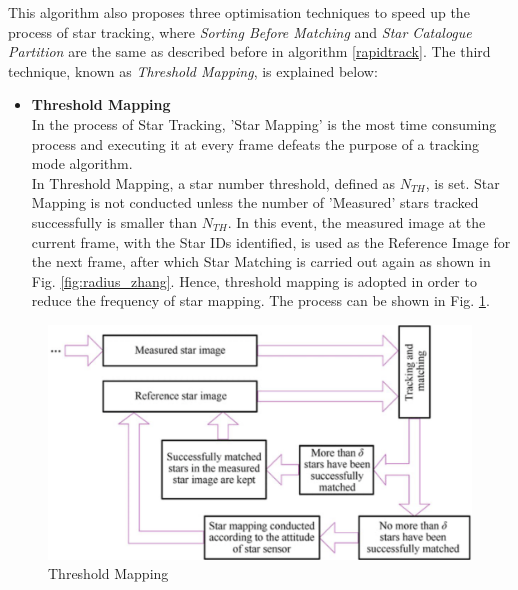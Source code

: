 \documentclass[../../main.tex]{subfiles}
\begin{document}
This algorithm also proposes three optimisation techniques to speed up the process of star tracking, where \textit{Sorting Before Matching} and \textit{Star Catalogue Partition} are the same as described before in algorithm \ref{rapidtrack}. The third technique, known as \textit{Threshold Mapping}, is explained below: 
\begin{itemize}
    \item \textbf{Threshold Mapping}\\ \label{threshold_mapping}
    In the process of Star Tracking, 'Star Mapping' is the most time consuming process and executing it at every frame defeats the purpose of a tracking mode algorithm. \\
    In Threshold Mapping, a star number threshold, defined as $N_{\textit{TH}}$, is set. Star Mapping is not conducted unless the number of 'Measured' stars tracked successfully is smaller than $N_{\textit{TH}}$. In this event, the measured image at the current frame, with the Star IDs identified, is used as the Reference Image for the next frame, after which Star Matching is carried out again as shown in Fig. \ref{fig:radius_zhang}. Hence, threshold mapping is adopted in order to reduce the frequency of star mapping. The process can be shown in Fig. \ref{fig:threshold_mapping}.
\end{itemize}
\begin{figure}[!h]
        \centering
        \includegraphics[scale=0.55]{Figures/GNC/threshold_mapping.png}
        \caption{Threshold Mapping}
        \label{fig:threshold_mapping}
\end{figure}
\end{document}
